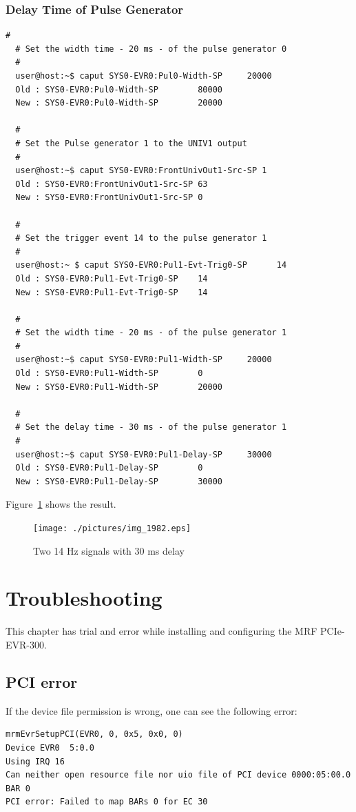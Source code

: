 \documentclass[11pt
  , a4paper
  , article
  , oneside
  , showtrims
]{memoir}
\begin{document}
\subsection{Delay Time of Pulse Generator}

\begin{lstlisting}[style=termstyle]
  #
  # Set the width time - 20 ms - of the pulse generator 0 
  #
  user@host:~$ caput SYS0-EVR0:Pul0-Width-SP     20000
  Old : SYS0-EVR0:Pul0-Width-SP        80000
  New : SYS0-EVR0:Pul0-Width-SP        20000

  #
  # Set the Pulse generator 1 to the UNIV1 output
  # 
  user@host:~$ caput SYS0-EVR0:FrontUnivOut1-Src-SP 1
  Old : SYS0-EVR0:FrontUnivOut1-Src-SP 63
  New : SYS0-EVR0:FrontUnivOut1-Src-SP 0

  #
  # Set the trigger event 14 to the pulse generator 1
  #
  user@host:~ $ caput SYS0-EVR0:Pul1-Evt-Trig0-SP      14
  Old : SYS0-EVR0:Pul1-Evt-Trig0-SP    14
  New : SYS0-EVR0:Pul1-Evt-Trig0-SP    14

  #
  # Set the width time - 20 ms - of the pulse generator 1 
  #
  user@host:~$ caput SYS0-EVR0:Pul1-Width-SP     20000
  Old : SYS0-EVR0:Pul1-Width-SP        0
  New : SYS0-EVR0:Pul1-Width-SP        20000

  #
  # Set the delay time - 30 ms - of the pulse generator 1 
  #
  user@host:~$ caput SYS0-EVR0:Pul1-Delay-SP     30000
  Old : SYS0-EVR0:Pul1-Delay-SP        0
  New : SYS0-EVR0:Pul1-Delay-SP        30000
\end{lstlisting}
Figure~\ref{fig:delay} shows the result.
\begin{figure}[!htb]
  \centering
    \texttt{[image: ./pictures/img\_1982.eps]}
  \caption{Two 14 Hz signals with 30 ms delay}
  \label{fig:delay}
\end{figure}

\clearpage
\chapter{Troubleshooting}
This chapter has trial and error while installing and configuring the MRF PCIe-EVR-300.

\section{PCI error}
If the device file permission is wrong, one can see the following error:
\begin{lstlisting}
mrmEvrSetupPCI(EVR0, 0, 0x5, 0x0, 0)
Device EVR0  5:0.0
Using IRQ 16
Can neither open resource file nor uio file of PCI device 0000:05:00.0 BAR 0
PCI error: Failed to map BARs 0 for EC 30
\end{lstlisting}


\clearpage
\backmatter
%
%
%

%

\end{document}
